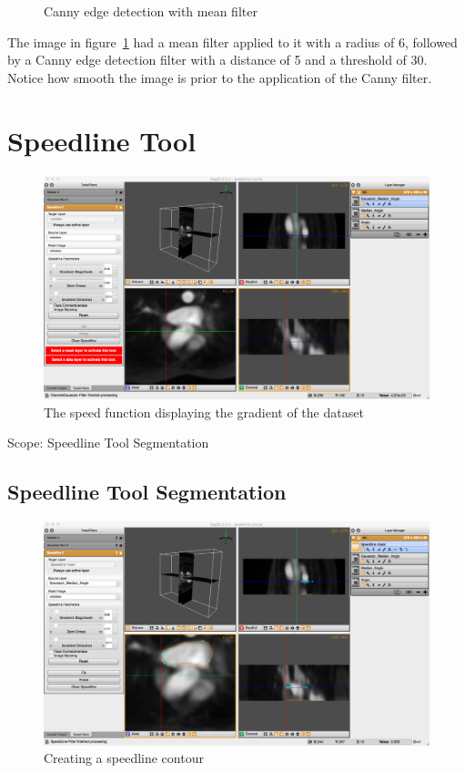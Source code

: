 \documentclass[fleqn,11pt,openany]{book}
\begin{document}
\begin{figure}
\caption{Canny edge detection with mean filter}\label{fig:Cannywithmeanandlayers}
\end{figure}

The image in figure~\ref{fig:Cannywithmeanandlayers} had a mean filter applied to it with a radius of 6, followed by a Canny edge detection filter with a distance of 5 and a threshold of 30. Notice how smooth the image is prior to the application of the Canny filter.



\chapter{Speedline Tool}

\begin{figure}
\includegraphics[width=\textwidth]{Seg3DTutorial_figures/SpeedlineImage.png}
\caption{The speed function displaying the gradient of the dataset}\label{fig:SpeedImage}
\end{figure}

\begin{introduction}
Scope: Speedline Tool Segmentation
\end{introduction}

\section{Speedline Tool Segmentation}

\begin{figure}
\includegraphics[width=\textwidth]{Seg3DTutorial_figures/Speedline.png}
\caption{Creating a speedline contour}\label{fig:SpeedLine1}
\end{figure}
\end{document}
